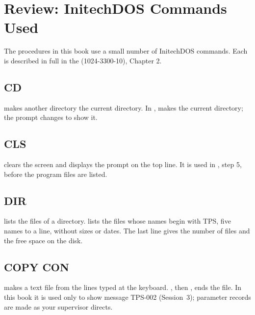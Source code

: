 \chapter{Review: InitechDOS Commands Used}

The procedures in this book use a small number of InitechDOS commands.  Each
is described in full in the  (1024-3300-10),
Chapter 2.

\section{CD}
 makes another directory the current directory.  In ,
 makes  the current directory; the prompt
changes to show it.


\section{CLS}
 clears the screen and displays the prompt on the top line.  It is
used in , step 5, before the program files are listed.

\section{DIR}
 lists the files of a directory.   lists the
files whose names begin with TPS, five names to a line, without sizes or
dates.  The last line gives the number of files and the free space on the
disk.


\section{COPY CON}
  makes a text file from the lines typed at the
keyboard.  , then , ends the file.  In this book it is
used only to show message TPS-002 (Session~3); parameter records are made as
your supervisor directs.

